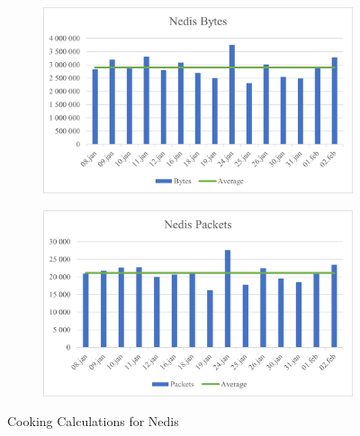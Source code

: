 \begin{figure}[H]
    \centering
    \begin{subfigure}{0.49\textwidth}
        \centering
        \includegraphics[width=1\hsize]{figures/Nedis_Cooking_Calculations_Bytes.png} 
    \end{subfigure}
    \begin{subfigure}{0.49\textwidth}
        \centering
        \includegraphics[width=1\hsize]{figures/Nedis_Cooking_Calculations_Packets.png} 
    \end{subfigure}
    \caption{Cooking Calculations for Nedis}
    \label{fig:NedisCookingCalculations}
\end{figure}

